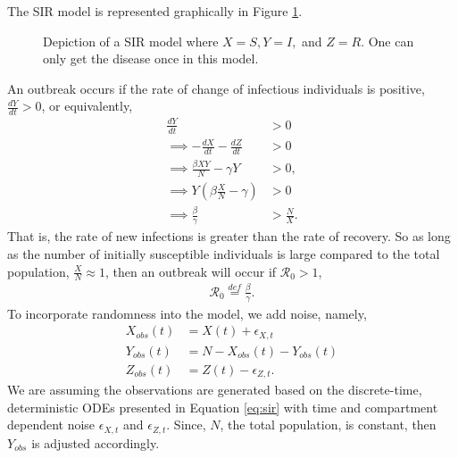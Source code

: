 \documentclass[12pt]{article}
\newcommand{\rr}{\ensuremath{\mathcal{R}_0}}
\begin{document}
The SIR model is represented graphically in Figure \ref{fig::sir}. 
\begin{figure}[h]
\centering
{}
\caption{Depiction of a SIR model where $X=S, Y=I,$ and $Z=R$.  One can only get the disease once in this model.}\label{fig::sir}
\end{figure}
An outbreak occurs if the rate of change of infectious individuals is positive, $\frac{dY}{dt} > 0$, or equivalently,
\begin{align*}
  \frac{dY}{dt} &> 0 \\
  \implies -\frac{dX}{dt} - \frac{dZ}{dt} &> 0 \\
  \implies \frac{\beta X Y}{N}  - \gamma Y &> 0 ,\\
\implies  Y \left ( \beta \frac{X}{N} - \gamma \right ) & > 0\\
\implies   \frac{\beta}{\gamma} &> \frac{N}{X}.
\end{align*}
That is,  the rate of new infections is greater than the rate of recovery.  So as long as the number of initially susceptible individuals is large compared to the total population, $\frac{X}{N} \approx 1$, then an outbreak will occur if $\rr >1$,
\begin{align*}
  \rr \overset{def}{=} \frac{\beta}{\gamma}.
  \end{align*}
  To incorporate randomness into the model, we add noise, namely,
  \begin{align}\label{eq:sir-noise}
    X_{obs}(t) &= X(t) + \epsilon_{X,t}\\
    Y_{obs}(t) &=  N - X_{obs}(t) -Y_{obs}(t)  \nonumber\\
    Z_{obs}(t) &= Z(t) - \epsilon_{Z,t}. \nonumber
  \end{align}
We are assuming the observations are generated based on the discrete-time,  deterministic ODEs presented in Equation \ref{eq:sir} with time and compartment dependent noise $\epsilon_{X,t}$ and $\epsilon_{Z,t}$.  Since, $N$, the total population, is constant, then $Y_{obs}$ is adjusted accordingly.
\end{document}

